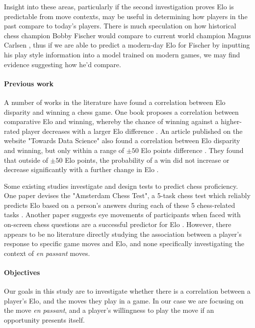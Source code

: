 \documentclass[10pt,a4paper]{article}
\begin{document}
\begin{multicols}{2}
Insight into these areas, particularly if the second investigation proves Elo is predictable from move contexts, may be useful in determining how players in the past compare to today's players. There is much speculation on how historical chess champion Bobby Fischer would compare to current world champion Magnus Carlsen \cite{BobbyFischerVsMagnusCarlsen}, thus if we are able to predict a modern-day Elo for Fischer by inputting his play style information into a model trained on modern games, we may find evidence suggesting how he'd compare.

\paragraph{Previous work}

A number of works in the literature have found a correlation between Elo disparity and winning a chess game. One book proposes a correlation between comparative Elo and winning, whereby the chance of winning against a higher-rated player decreases with a larger Elo difference \cite{PsychologyOfChessSkill}. An article published on the website "Towards Data Science" also found a correlation between Elo disparity and winning, but only within a range of $\pm 50$ Elo points difference \cite{HowMuchDoesEloMatter}. They found that outside of $\pm 50$ Elo points, the probability of a win did not increase or decrease significantly with a further change in Elo \cite{HowMuchDoesEloMatter}. \newline

Some existing studies investigate and design tests to predict chess proficiency. One paper devises the "Amsterdam Chess Test", a 5-task chess test which reliably predicts Elo based on a person's answers during each of these 5 chess-related tasks \cite{PsychometricAnalysisChessExpertise}. Another paper suggests eye movements of participants when faced with on-screen chess questions are a successful predictor for Elo \cite{VisualPerceptionRankingChess}. However, there appears to be no literature directly studying the association between a player's response to specific game moves and Elo, and none specifically investigating the context of \textit{en passant} moves.


\paragraph{Objectives}

Our goals in this study are to investigate whether there is a correlation between a player's Elo, and the moves they play in a game. In our case we are focusing on the move \textit{en passant}, and a player's willingness to play the move if an opportunity presents itself. \newline


\end{multicols}
\end{document}
